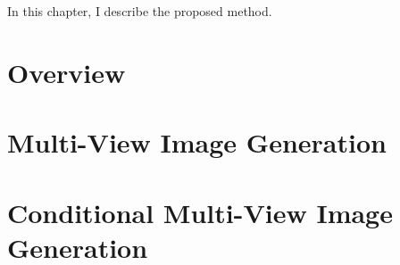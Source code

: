 \label{chapter:proposed-method}

In this chapter, I describe the proposed method.

\section{Overview}

\section{Multi-View Image Generation}

\section{Conditional Multi-View Image Generation}
